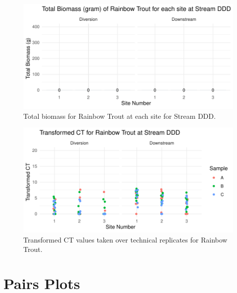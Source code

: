 \begin{figure}[H]
\centering
\includegraphics{AppendixImages/DDD_Rb_new.pdf}
\caption{ \hspace{1mm}    Total biomass for Rainbow Trout at each site for Stream DDD.}
\label{fig:testDDDrb}
\end{figure}




\begin{figure}[H]
\centering
\includegraphics{AppendixImages/DDD_rb_tct.pdf}
\caption{ \hspace{1mm}  Transformed CT values taken over technical replicates for Rainbow Trout.}
\label{fig:DDD_rb}
\end{figure}




\section{Pairs Plots}


